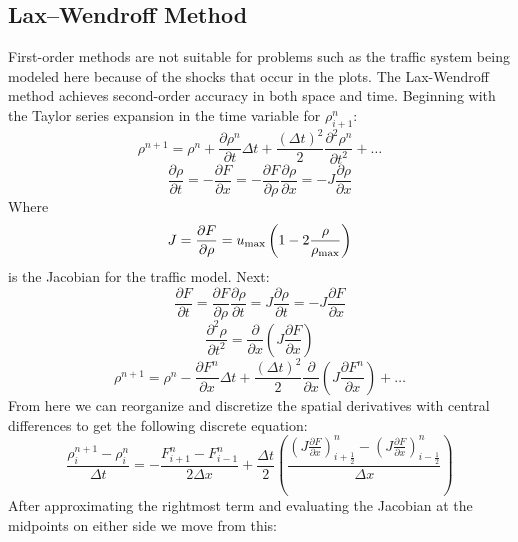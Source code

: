 \documentclass{article}
\begin{document}
\subsection{Lax–Wendroff Method}
First-order methods are not suitable for problems such as the traffic system being modeled here because of the shocks that occur in the plots. The Lax-Wendroff method achieves second-order accuracy in both space and time. Beginning with the Taylor series expansion in the time variable for $\rho^n_{i+1}$:
\begin{equation}\rho^{n+1} = \rho^n + \frac{\partial\rho^n}{\partial t} \Delta t + \frac{(\Delta t)^2}{2}\frac{\partial^2\rho^n}{\partial t^2} + \ldots \end{equation}
\begin{equation}\frac{\partial \rho}{\partial t} = -\frac{\partial F}{\partial x} = -\frac{\partial F}{\partial \rho} \frac{\partial \rho}{\partial x} = -J \frac{\partial \rho}{\partial x}\end{equation}
Where
\begin{equation}J = \frac{\partial F}{\partial \rho} = u _{\rm max} \left(1-2\frac{\rho}{\rho_{\rm max}} \right)\end{equation}
is the Jacobian for the traffic model. Next:
\begin{equation} \frac{\partial F}{\partial t} = \frac{\partial F}{\partial \rho} \frac{\partial \rho}{\partial t} = J \frac{\partial \rho}{\partial t} = -J \frac{\partial F}{\partial x}\end{equation}
\begin{equation}\frac{\partial^2\rho}{\partial t^2} = \frac{\partial}{\partial x} \left( J \frac{\partial F}{\partial x} \right) \end{equation}
\begin{equation}\rho^{n+1} = \rho^n - \frac{\partial F^n}{\partial x} \Delta t + \frac{(\Delta t)^2}{2} \frac{\partial}{\partial x} \left(J\frac{\partial F^n}{\partial x} \right)+ \ldots \end{equation}
From here we can reorganize and discretize the spatial derivatives with central differences to get the following discrete equation:
\begin{equation}\frac{\rho_i^{n+1} - \rho_i^n}{\Delta t} = -\frac{F^n_{i+1}-F^n_{i-1}}{2 \Delta x} + \frac{\Delta t}{2} \left(\frac{(J \frac{\partial F}{\partial x})^n_{i+\frac{1}{2}}-(J \frac{\partial F}{\partial x})^n_{i-\frac{1}{2}}}{\Delta x}\right)\end{equation}
After approximating the rightmost term and evaluating the Jacobian at the midpoints on either side we move from this:
\end{document}
